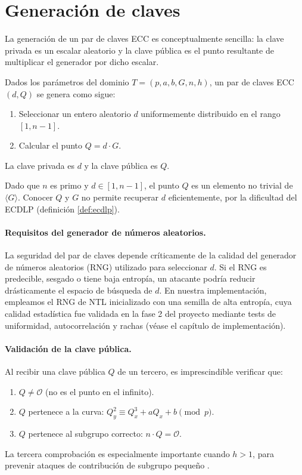 \section{Generación de claves}
\label{sec:ecc-keygen}

La generación de un par de claves ECC es conceptualmente sencilla: la clave privada es un escalar aleatorio y la clave pública es el punto resultante de multiplicar el generador por dicho escalar.

\begin{definicion}
\label{def:ecc-keypair}
Dados los parámetros del dominio $T = (p, a, b, G, n, h)$, un par de claves ECC $(d, Q)$ se genera como sigue:
\begin{enumerate}
    \item Seleccionar un entero aleatorio $d$ uniformemente distribuido en el rango $[1, n-1]$.
    \item Calcular el punto $Q = d \cdot G$.
\end{enumerate}
La clave privada es $d$ y la clave pública es $Q$.
\end{definicion}

Dado que $n$ es primo y $d \in [1, n-1]$, el punto $Q$ es un elemento no trivial de $\langle G \rangle$. Conocer $Q$ y $G$ no permite recuperar $d$ eficientemente, por la dificultad del ECDLP (definición \ref{def:ecdlp}).

\paragraph{Requisitos del generador de números aleatorios.}
La seguridad del par de claves depende críticamente de la calidad del generador de números aleatorios (RNG) utilizado para seleccionar $d$. Si el RNG es predecible, sesgado o tiene baja entropía, un atacante podría reducir drásticamente el espacio de búsqueda de $d$. En nuestra implementación, empleamos el RNG de NTL inicializado con una semilla de alta entropía, cuya calidad estadística fue validada en la fase 2 del proyecto mediante tests de uniformidad, autocorrelación y rachas (véase el capítulo de implementación).

\paragraph{Validación de la clave pública.}
Al recibir una clave pública $Q$ de un tercero, es imprescindible verificar que:
\begin{enumerate}
    \item $Q \neq \mathcal{O}$ (no es el punto en el infinito).
    \item $Q$ pertenece a la curva: $Q_y^2 \equiv Q_x^3 + aQ_x + b \pmod{p}$.
    \item $Q$ pertenece al subgrupo correcto: $n \cdot Q = \mathcal{O}$.
\end{enumerate}
La tercera comprobación es especialmente importante cuando $h > 1$, para prevenir ataques de contribución de subgrupo pequeño \cite{hankerson2004guide}.


